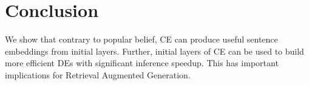 \section{Conclusion}
We show that contrary to popular belief, 
CE can produce useful sentence embeddings from initial layers. Further, initial layers of CE 
can be used to build more efficient DEs with significant inference speedup. 
This has important implications for Retrieval Augmented Generation.  